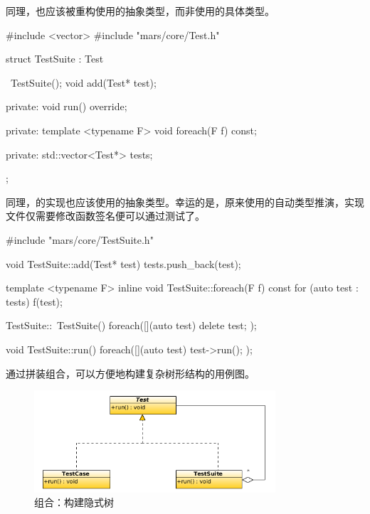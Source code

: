 \begin{content}
同理，也应该被重构使用的抽象类型，而非使用的具体类型。

\begin{leftbar}
 \begin{c++}[caption={\ttfamily{include/mars/core/TestSuite.h}}]
#include <vector>
#include "mars/core/Test.h"

struct TestSuite : Test {
  ~TestSuite();
  void add(Test* test);

private:
  void run() override;

private:
  template <typename F>
  void foreach(F f) const;

private:
  std::vector<Test*> tests;
};
 \end{c++}
\end{leftbar}

同理，的实现也应该使用的抽象类型。幸运的是，原来使用的自动类型推演，实现文件仅需要修改函数签名便可以通过测试了。

\begin{leftbar}
 \begin{c++}[caption={\ttfamily{src/mars/core/TestSuite.cc}}]
#include "mars/core/TestSuite.h"

void TestSuite::add(Test* test) {
  tests.push_back(test);
}

template <typename F>
inline void TestSuite::foreach(F f) const {
  for (auto test : tests) {
    f(test);
  }
}

TestSuite::~TestSuite() {
  foreach([](auto test) {
    delete test;
  });
}

void TestSuite::run() {
  foreach([](auto test) {
    test->run();
  });
}
 \end{c++}
\end{leftbar}

通过拼装组合，可以方便地构建复杂树形结构的用例图。

\begin{figure}[H]
\centering
\includegraphics[width=0.8\textwidth]{figures/xunit/test-tree.png}
\caption{组合：构建隐式树}
 \label{fig:test-tree}
\end{figure}


\end{content}

